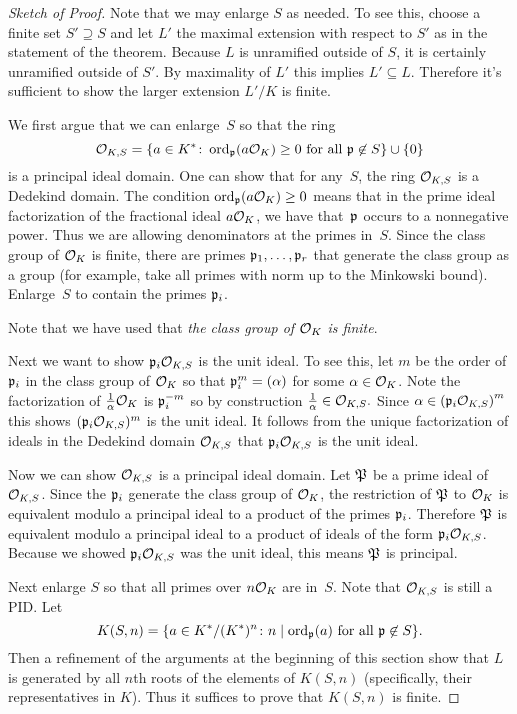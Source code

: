 \begin{proof}[Sketch of Proof]
	Note that we may enlarge $S$ as needed. To see this,
	choose a finite set $S' \supseteq S$ and let $L'$ the
	maximal extension with respect to $S'$ as in the
	statement of the theorem. Because $L$ is unramified
	outside of $S$, it is certainly unramified outside of
	$S'$. By maximality of $L'$ this implies $L' \subseteq L$.
	Therefore it's sufficient to show the larger extension
	$L'/K$ is finite.
	
	We first argue that we can enlarge~$S$ so that the ring
	$$
		\O_{K,S} =
			\{
			a \in K^* \colon \ord_\p(a\O_K) \geq 0 \text{ for all } \p\not\in S
			\}
			\union\{0\}
	$$
	is a principal ideal domain.
	One can show that for any~$S$, the ring $\O_{K,S}$ is a Dedekind domain.
	The condition $ \ord_\p(a\O_K) \geq 0$
	means that in the prime ideal factorization of the fractional ideal
	$a\O_K$, we have that~$\p$ occurs to a nonnegative power. Thus we are
	allowing denominators at the primes in~$S$. Since the class group of
	$\O_K$ is finite, there are primes $\p_1,\ldots, \p_r$ that generate
	the class group as a group (for example, take all primes with norm up to
	the Minkowski bound). Enlarge~$S$ to contain the primes $\p_i$.
	
	Note that we have used that \emph{the class group of $\O_K$ is finite}.
	
	Next we want to show $\p_i\O_{K,S}$ is the unit ideal. To see this,
	let $m$ be the order of $\p_i$ in the class group of $\O_{K}$ so that
	$\p_i^m = (\alpha)$ for some $\alpha\in \O_{K}$. Note the factorization
	of $\frac{1}{\alpha}\O_{K}$ is $\p_i^{-m}$ so by construction
	$\frac{1}{\alpha}\in\O_{K,S}.$ Since
	$\alpha\in \left(\p_i\O_{K,S}\right)^m$ this shows $(\p_i\O_{K,S})^m$
	is the unit ideal. It follows from the unique factorization of ideals
	in the Dedekind domain $\O_{K,S}$ that $\p_i\O_{K,S}$ is the unit ideal.
	
	Now we can show $\O_{K,S}$ is a principal ideal domain. Let $\P$
	be a prime ideal of $\O_{K,S}$. Since the $\p_i$ generate
	the class group of $\O_K$, the restriction of $\P$ to $\O_K$ is
	equivalent modulo a principal ideal to a product of the primes
	$\p_i$. Therefore $\P$ is equivalent modulo a principal ideal
	to a product of ideals of the form $\p_i\O_{K,S}$. Because we showed
	$\p_i\O_{K,S}$ was the unit ideal, this means $\P$ is principal.
	
	Next enlarge $S$ so that all primes over $n\O_K$ are in~$S$.
	Note that $\O_{K,S}$ is still a PID.  Let
	$$
	 K(S,n) =
	 	\{
	 	a \in K^*/(K^*)^n \colon n \mid \ord_\p(a) \text{ for all } \p\not\in S
	 	\}.
	$$
	Then a refinement of the arguments at the beginning of
	this section show that $L$ is generated by all $n$th roots
	of the elements of $K(S,n)$ (specifically, their representatives in $K$).
	Thus it suffices to prove that $K(S,n)$ is finite.
	

\end{proof}
